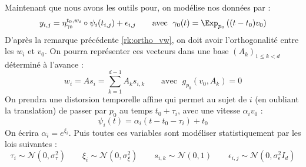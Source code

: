 Maintenant que nous avons les outils pour, on modélise nos données par :
\begin{equation}
	y_{i, j} = \eta_{\gamma_0}^{t_0, w_i} \circ \psi_i(t_{i,j}) + \epsilon_{i,j} \qquad \text{avec } \; \gamma_0(t) = \Exp_{p_0} \left( (t - t_0) v_0 \right)
\end{equation}
D'après la remarque précédente \ref{rk:ortho_vw}, on doit avoir l'orthogonalité entre les $w_i$ et $v_0$. On pourra représenter ces vecteurs dans une base $\left( A_k \right)_{1 \leqslant k < d}$ déterminé à l'avance :
\begin{equation}
	w_i = A s_i = \sum_{k=1}^{d-1} A_k s_{i,k} \qquad \text{avec } \; g_{p_0}(v_0, A_k) = 0
\end{equation}
On prendra une distorsion temporelle affine qui permet au sujet de $i$ (en oubliant la translation) de passer par $p_0$ au temps $t_0 + \tau_i$, avec une vitesse $\alpha_i v_0$ :
\begin{equation}
	\psi_i(t) = \alpha_i \left( t - t_0 - \tau_i \right) + t_0
\end{equation}
On écrira $\alpha_i = e^{\xi_i}$. Puis toutes ces variables sont modéliser statistiquement par les lois suivantes :
\begin{equation}
	\tau_i \sim \mathcal{N}(0, \sigma_\tau^2) \qquad \xi_i \sim \mathcal{N}(0, \sigma_\xi^2) \qquad s_{i,k} \sim \mathcal{N}(0, 1) \qquad \epsilon_{i,j} \sim \mathcal{N}(0, \sigma_\epsilon^2 I_d)
\end{equation}